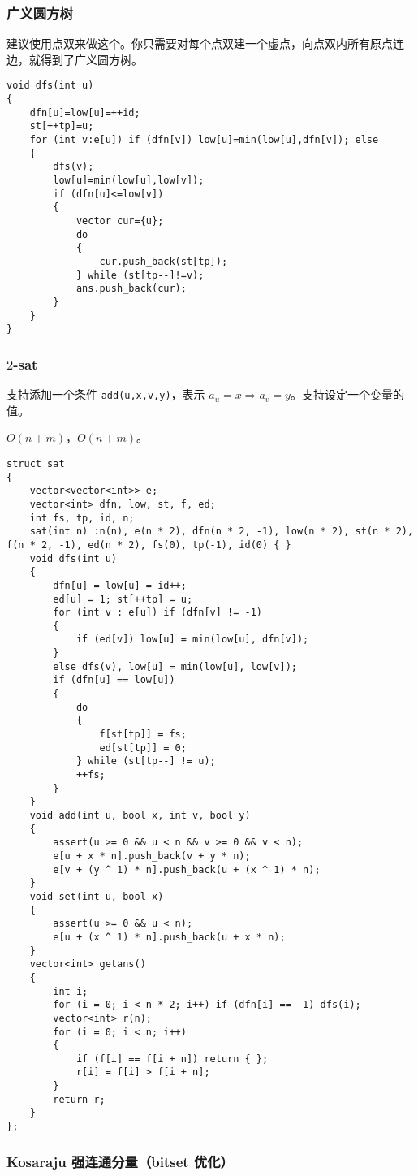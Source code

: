 \documentclass[12pt]{ctexart}
\begin{document}
\subsubsection{广义圆方树}

建议使用点双来做这个。你只需要对每个点双建一个虚点，向点双内所有原点连边，就得到了广义圆方树。

\begin{lstlisting}
void dfs(int u)
{
	dfn[u]=low[u]=++id;
	st[++tp]=u;
	for (int v:e[u]) if (dfn[v]) low[u]=min(low[u],dfn[v]); else
	{
		dfs(v);
		low[u]=min(low[u],low[v]);
		if (dfn[u]<=low[v])
		{
			vector cur={u};
			do
			{
				cur.push_back(st[tp]);
			} while (st[tp--]!=v);
			ans.push_back(cur);
		}
	}
}
\end{lstlisting}

\subsubsection{$2$-sat}

支持添加一个条件 \verb|add(u,x,v,y)|，表示 $a_u=x\Rightarrow a_v=y$。支持设定一个变量的值。

$O(n+m)$，$O(n+m)$。

\begin{lstlisting}
struct sat
{
	vector<vector<int>> e;
	vector<int> dfn, low, st, f, ed;
	int fs, tp, id, n;
	sat(int n) :n(n), e(n * 2), dfn(n * 2, -1), low(n * 2), st(n * 2), f(n * 2, -1), ed(n * 2), fs(0), tp(-1), id(0) { }
	void dfs(int u)
	{
		dfn[u] = low[u] = id++;
		ed[u] = 1; st[++tp] = u;
		for (int v : e[u]) if (dfn[v] != -1)
		{
			if (ed[v]) low[u] = min(low[u], dfn[v]);
		}
		else dfs(v), low[u] = min(low[u], low[v]);
		if (dfn[u] == low[u])
		{
			do
			{
				f[st[tp]] = fs;
				ed[st[tp]] = 0;
			} while (st[tp--] != u);
			++fs;
		}
	}
	void add(int u, bool x, int v, bool y)
	{
		assert(u >= 0 && u < n && v >= 0 && v < n);
		e[u + x * n].push_back(v + y * n);
		e[v + (y ^ 1) * n].push_back(u + (x ^ 1) * n);
	}
	void set(int u, bool x)
	{
		assert(u >= 0 && u < n);
		e[u + (x ^ 1) * n].push_back(u + x * n);
	}
	vector<int> getans()
	{
		int i;
		for (i = 0; i < n * 2; i++) if (dfn[i] == -1) dfs(i);
		vector<int> r(n);
		for (i = 0; i < n; i++)
		{
			if (f[i] == f[i + n]) return { };
			r[i] = f[i] > f[i + n];
		}
		return r;
	}
};

\end{lstlisting}


\subsubsection{Kosaraju 强连通分量（bitset 优化）}
\end{document}
